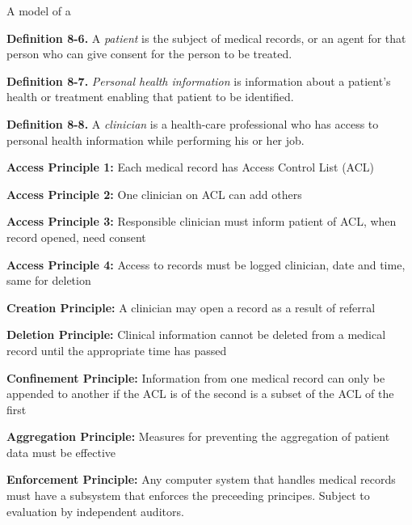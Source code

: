 \documentclass[Screen16to9,17pt]{foils}
\begin{document}


\begin{list1}
\item A model of a
\item {\bf Definition 8-6.} A \emph{patient} is the subject of medical records, or an agent for that person who can give consent for the person to be treated.
\item {\bf Definition 8-7.} \emph{Personal health information} is information about a patient's health or treatment enabling that patient to be identified.
\item {\bf Definition 8-8.} A \emph{clinician} is a health-care professional who has access to personal health information while performing his or her job.
\end{list1}


\begin{list2}
\item {\bf Access Principle 1:} Each medical record has Access Control List (ACL)
\item {\bf Access Principle 2:} One clinician on ACL can add others
\item {\bf Access Principle 3:} Responsible clinician must inform patient of ACL, when record opened, need consent
\item {\bf Access Principle 4:} Access to records must be logged clinician, date and time, same for deletion
\item {\bf Creation Principle:} A clinician may open a record as a result of referral
\item {\bf Deletion Principle:} Clinical information cannot be deleted from a medical record until the appropriate time has passed
\item {\bf Confinement Principle:} Information from one medical record can only be appended to another if the ACL is of the second is a subset of the ACL of the first
\item {\bf Aggregation Principle:} Measures for preventing the aggregation of patient data must be effective
\item {\bf Enforcement Principle:} Any computer system that handles medical records must have a subsystem that enforces the preceeding principes. Subject to evaluation by independent auditors.
\end{list2}
\end{document}
